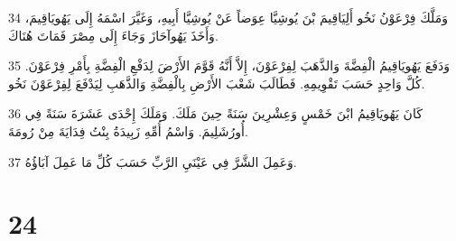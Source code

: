 \par 34 وَمَلَّكَ فِرْعَوْنُ نَخُو أَلِيَاقِيمَ بْنَ يُوشِيَّا عِوَضاً عَنْ يُوشِيَّا أَبِيهِ، وَغَيَّرَ اسْمَهُ إِلَى يَهُويَاقِيمَ، وَأَخَذَ يَهُوآحَازَ وَجَاءَ إِلَى مِصْرَ فَمَاتَ هُنَاكَ.
\par 35 وَدَفَعَ يَهُويَاقِيمُ الْفِضَّةَ وَالذَّهَبَ لِفِرْعَوْنَ، إِلاَّ أَنَّهُ قَوَّمَ الأَرْضَ لِدَفْعِ الْفِضَّةِ بِأَمْرِ فِرْعَوْنَ. كُلَّ وَاحِدٍ حَسَبَ تَقْوِيمِهِ. فَطَالَبَ شَعْبَ الأَرْضِ بِالْفِضَّةِ وَالذَّهَبِ لِيَدْفَعَ لِفِرْعَوْنَ نَخُو.
\par 36 كَانَ يَهُويَاقِيمُ ابْنَ خَمْسٍ وَعِشْرِينَ سَنَةً حِينَ مَلَكَ. وَمَلَكَ إِحْدَى عَشَرَةَ سَنَةً فِي أُورُشَلِيمَ. وَاسْمُ أُمِّهِ زَبِيدَةُ بِنْتُ فِدَايَةَ مِنْ رُومَةَ.
\par 37 وَعَمِلَ الشَّرَّ فِي عَيْنَيِ الرَّبِّ حَسَبَ كُلِّ مَا عَمِلَ آبَاؤُهُ.

\chapter{24}

